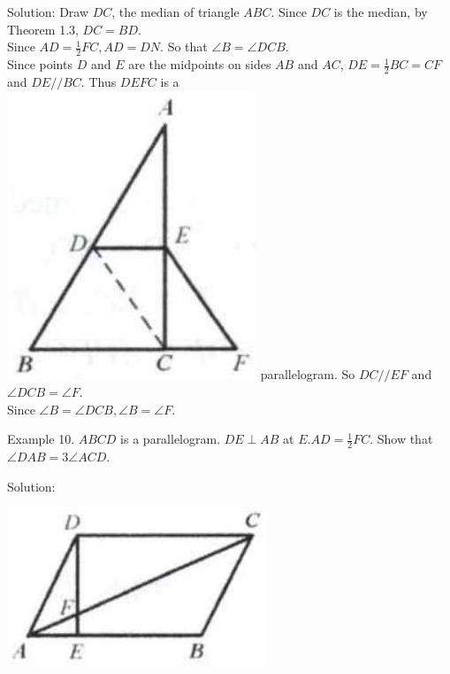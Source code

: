 \documentclass[10pt]{article}
\begin{document}
Solution:
Draw \(D C\), the median of triangle \(A B C\). Since \(D C\) is the median, by Theorem 1.3, \(D C=B D\).\\
Since \(A D=\frac{1}{2} F C, A D=D N\). So that \(\angle B=\angle D C B\).\\
Since points \(D\) and \(E\) are the midpoints on sides \(A B\) and \(A C\), \(D E=\frac{1}{2} B C=C F\) and \(D E / / B C\). Thus \(D E F C\) is a\\
\includegraphics[max width=\textwidth]{2025_04_17_97bc1f7e44d93c271a88g-012} parallelogram. So \(D C / / E F\) and \(\angle D C B=\angle F\).\\
Since \(\angle B=\angle D C B, \angle B=\angle F\).

Example 10. \(A B C D\) is a parallelogram. \(D E \perp A B\) at \(E . A D=\frac{1}{2} F C\). Show that \(\angle D A B=3 \angle A C D\).

Solution:
\begin{center}
\includegraphics[max width=\textwidth]{2025_04_17_97bc1f7e44d93c271a88g-012(1)}
\end{center}
\end{document}

